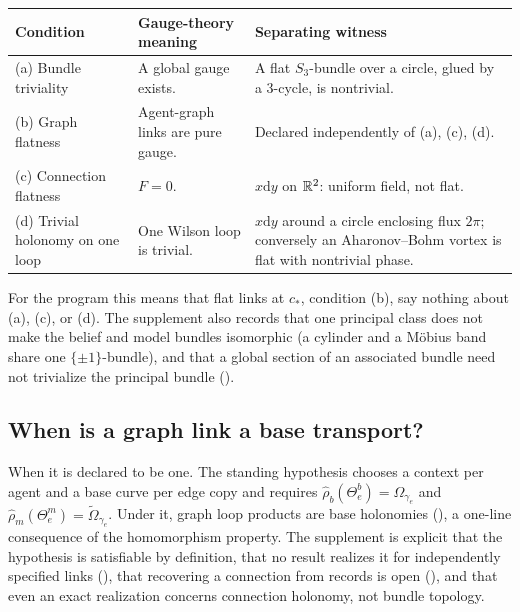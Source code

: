 \begin{center}
\small\renewcommand{\arraystretch}{1.15}
\begin{tabular}{@{}>{\raggedright\arraybackslash}p{}>{\raggedright\arraybackslash}p{}>{\raggedright\arraybackslash}p{}@{}}
\toprule
\textbf{Condition} & \textbf{Gauge-theory meaning} & \textbf{Separating witness} \\
\midrule
(a) Bundle triviality & A global gauge exists. & A flat \(S_3\)-bundle over a circle, glued by a
3-cycle, is nontrivial. \\
(b) Graph flatness & Agent-graph links are pure gauge. & Declared independently of (a), (c), (d). \\
(c) Connection flatness & \(F=0\). & \(x\mathrm dy\) on \(\mathbb R^2\): uniform field, not flat. \\
(d) Trivial holonomy on one loop & One Wilson loop is trivial. & \(x\mathrm dy\) around a circle
enclosing flux \(2\pi\); conversely an Aharonov--Bohm vortex is flat with nontrivial phase. \\
\bottomrule
\end{tabular}
\end{center}

For the program this means that flat links at \(c_*\), condition (b), say nothing about (a), (c), or
(d). The supplement also records that one principal class does not make the belief and model bundles
isomorphic (a cylinder and a Möbius band share one \(\{\pm1\}\)-bundle), and that a global section of an
associated bundle need not trivialize the principal bundle ().

\subsection{When is a graph link a base transport?}
\label{comp:sb-graph-base}

When it is declared to be one. The standing hypothesis  chooses a
context per agent and a base curve per edge copy and requires
\(\widehat\rho_b(\Theta_e^b)=\Omega_{\gamma_e}\) and \(\widehat\rho_m(\Theta_e^m)=\widetilde\Omega_{\gamma_e}\).
Under it, graph loop products are base holonomies (), a one-line
consequence of the homomorphism property. The supplement is explicit that the hypothesis is satisfiable
by definition, that no result realizes it for independently specified links
(), that recovering a connection from records is open
(), and that even an exact realization concerns connection holonomy,
not bundle topology.

